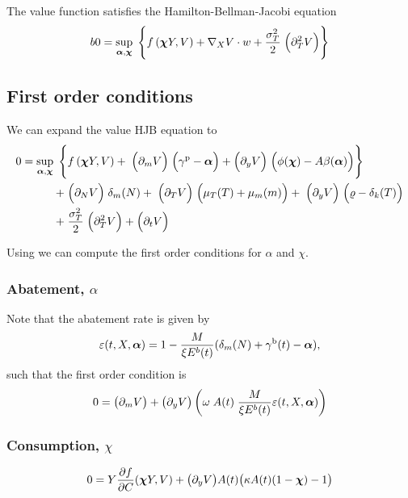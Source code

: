 \documentclass[../../main.tex]{subfiles}
\begin{document}
\begin{proposition}
    The value function satisfies the Hamilton-Bellman-Jacobi equation \begin{equation}b
        0 = \sup_{\bm{\alpha}, \bm{\chi}} \; \Bigg\{ f\left(\bm{\chi} Y, V\right) + \nabla_X V \cdot w + \frac{\sigma_T^2}{2} \; \Big(\partial^2_T V \Big) \Bigg\}
    \end{equation}
\end{proposition}

\subsection{First order conditions}

We can expand the value HJB equation to     
\begin{equation}
    \begin{split}
        0 = \sup_{\bm{\alpha}, \bm{\chi}} \; \Bigg\{ &f\left(\bm{\chi} Y, V\right) + \;
        \Big(\partial_{m} V \Big) \; \Big(\gamma^{\mathrm{p}} - \bm{\alpha} \Big) + \Big(\partial_{y} V \Big) \;  \Big(\phi(\bm{\chi}) - A \beta(\bm{\alpha}) \Big) \Bigg\} \\
        + \; &\Big(\partial_{N} V\Big) \; \delta_m(N) + \;
        \Big(\partial_T V \Big) \; \Big(\mu_T(T) + \mu_{m}(m) \Big) + \;
        \Big(\partial_{y} V \Big) \; \Big(\varrho - \delta_k(T) \Big) \\
        + \; &\frac{\sigma_T^2}{2} \; \Big(\partial^2_T V \Big) + \Big(\partial_t V\Big)
    \end{split}
\end{equation}

Using we can compute the first order conditions for $\alpha$ and $\chi$. 

\subsubsection[Abatement]{Abatement, $\alpha$}

Note that the abatement rate is given by \begin{equation}
    \varepsilon(t, X, \bm{\alpha}) = 1 - \frac{M}{\xi E^b(t)} (\delta_m(N) + \gamma^{\mathrm{b}}(t) - \bm{\alpha}),
\end{equation} such that the first order condition is \begin{equation}
    0 = \big(\partial_m V\big) + \big(\partial_y V\big) \left(\omega \; A(t) \; \frac{M}{\xi E^b(t)} \varepsilon(t, X, \bm{\alpha}) \right)
\end{equation}

\subsubsection[Consumption]{Consumption, $\chi$}

\begin{equation}
    0 = Y \frac{\partial f}{\partial C}(\bm{\chi} Y, V) +\big(\partial_y V\big) A(t) \big(\kappa A(t) (1 - \bm{\chi}) - 1\big) 
\end{equation}
\end{document}
